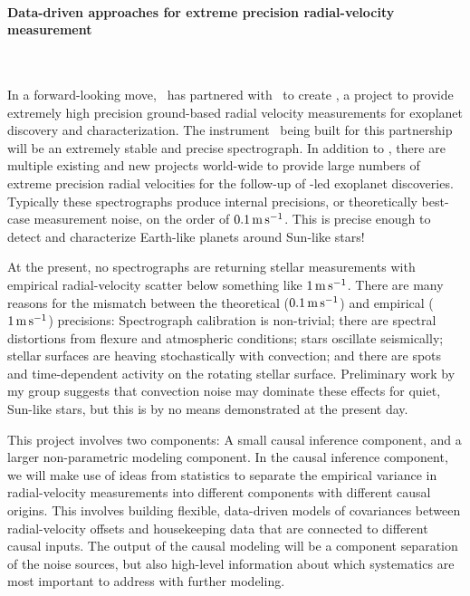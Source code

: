 \documentclass[12pt, fullpage, letterpaper]{article}
\begin{document}
\paragraph{Data-driven approaches for extreme precision radial-velocity measurement}
~

\bigskip
In a forward-looking move, \NASA\ has partnered with \NSF\ to create
\NNEXPLORE, a project to provide extremely high precision ground-based
radial velocity measurements for exoplanet discovery and
characterization. The instrument \NEID\ being built for this partnership
will be an extremely stable and precise spectrograph. In addition to
\NEID, there are multiple existing and new projects world-wide to
provide large numbers of extreme precision radial velocities for the
follow-up of \NASA-led exoplanet discoveries. Typically these
spectrographs produce internal precisions, or theoretically best-case
measurement noise, on the order of $0.1\,{\mathrm{m\,s^{-1}}}$. This is precise enough to
detect and characterize Earth-like planets around Sun-like stars!

At the present, no spectrographs are returning stellar measurements
with empirical radial-velocity scatter below something like $1\,{\mathrm{m\,s^{-1}}}$.
There are many reasons for the mismatch between the theoretical
($0.1\,{\mathrm{m\,s^{-1}}}$) and empirical ($1\,{\mathrm{m\,s^{-1}}}$) precisions: Spectrograph calibration
is non-trivial; there are spectral distortions from flexure and
atmospheric conditions; stars oscillate seismically; stellar surfaces
are heaving stochastically with convection; and there are spots and
time-dependent activity on the rotating stellar surface. Preliminary
work by my group suggests that convection noise may dominate these
effects for quiet, Sun-like stars, but this is by no means
demonstrated at the present day.

This project involves two components: A small causal inference
component, and a larger non-parametric modeling component. In the
causal inference component, we will make use of ideas from statistics
to separate the empirical variance in radial-velocity measurements
into different components with different causal origins. This involves
building flexible, data-driven models of covariances between
radial-velocity offsets and housekeeping data that are connected to
different causal inputs. The output of the causal modeling will be a
component separation of the noise sources, but also high-level
information about which systematics are most important to address with
further modeling.
\end{document}

